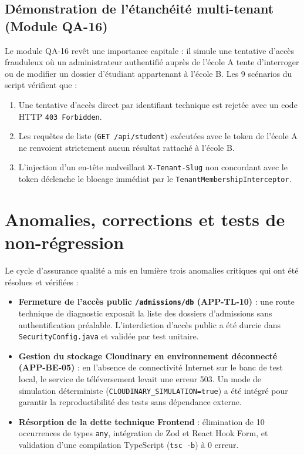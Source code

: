 \subsection{Démonstration de l'étanchéité multi-tenant (Module QA-16)}

Le module QA-16 revêt une importance capitale : il simule une tentative d'accès frauduleux où un administrateur authentifié auprès de l'école A tente d'interroger ou de modifier un dossier d'étudiant appartenant à l'école B. Les 9 scénarios du script vérifient que :
\begin{enumerate}
    \item Une tentative d'accès direct par identifiant technique est rejetée avec un code HTTP \texttt{403 Forbidden}.
    \item Les requêtes de liste (\texttt{GET /api/student}) exécutées avec le token de l'école A ne renvoient strictement aucun résultat rattaché à l'école B.
    \item L'injection d'un en-tête malveillant \texttt{X-Tenant-Slug} non concordant avec le token déclenche le blocage immédiat par le \texttt{TenantMembershipInterceptor}.
\end{enumerate}

\section{Anomalies, corrections et tests de non-régression}

Le cycle d'assurance qualité a mis en lumière trois anomalies critiques qui ont été résolues et vérifiées :
\begin{itemize}
    \item \textbf{Fermeture de l'accès public \nolinkurl{/admissions/db} (APP-TL-10)} : une route technique de diagnostic exposait la liste des dossiers d'admissions sans authentification préalable. L'interdiction d'accès public a été durcie dans \texttt{SecurityConfig.java} et validée par test unitaire.
    \item \textbf{Gestion du stockage Cloudinary en environnement déconnecté (APP-BE-05)} : en l'absence de connectivité Internet sur le banc de test local, le service de téléversement levait une erreur 503. Un mode de simulation déterministe (\texttt{CLOUDINARY\_SIMULATION=true}) a été intégré pour garantir la reproductibilité des tests sans dépendance externe.
    \item \textbf{Résorption de la dette technique Frontend} : élimination de 10 occurrences de types \texttt{any}, intégration de Zod et React Hook Form, et validation d'une compilation TypeScript (\texttt{tsc -b}) à 0 erreur.
\end{itemize}

